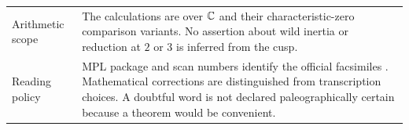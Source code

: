 \begin{center}
\begin{tabularx}{\textwidth}{@{}p{}X@{}}
Arithmetic scope&The calculations are over $\mathbb C$ and their characteristic-zero comparison variants. No assertion about wild inertia or reduction at $2$ or $3$ is inferred from the cusp.\\
Reading policy&MPL package and scan numbers identify the official facsimiles \citep{GrothMPL147,GrothMPL149}. Mathematical corrections are distinguished from transcription choices. A doubtful word is not declared paleographically certain because a theorem would be convenient.\\
\bottomrule
\end{tabularx}
\end{center}
